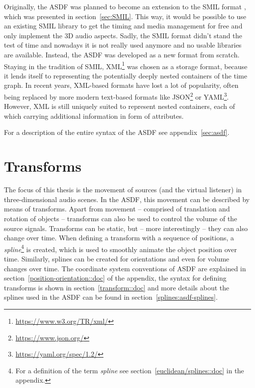 Originally, the ASDF was planned to become
an extension to the SMIL format
\parencite{geier2010future,geier2010object-based},
which was presented in section~\ref{sec:SMIL}.
This way, it would be possible to use an existing SMIL library
to get the timing and media management for free
and only implement the 3D audio aspects.
Sadly, the SMIL format didn't stand the test of time and
nowadays it is not really used anymore and no usable libraries are available.
Instead, the ASDF was developed as a new format from scratch.
Staying in the tradition of SMIL,
XML\footnote{\url{https://www.w3.org/TR/xml/}} was chosen as a storage format,
because it lends itself to representing the potentially deeply nested containers
of the time graph.
In recent years, XML-based formats have lost a lot of popularity,
often being replaced by more modern text-based formats like
JSON\footnote{\url{https://www.json.org/}} or
YAML\footnote{\url{https://yaml.org/spec/1.2/}}.
However, XML is still uniquely suited to represent nested containers,
each of which carrying additional information in form of attributes.

For a description of the entire syntax of the ASDF see appendix~\ref{sec:asdf}.


\section{Transforms}
\label{sec:development-transforms}

The focus of this thesis is the movement of sources (and the virtual listener)
in three-dimensional audio scenes.
In the ASDF, this movement can be described by means of transforms.
Apart from movement -- comprised of translation and rotation of objects --
transforms can also be used to control the volume of the source signals.
Transforms can be static, but -- more interestingly --
they can also change over time.
When defining a transform with a sequence of positions,
a \emph{spline}\footnote{%
For a definition of the term \emph{spline}
see section~\ref{euclidean/splines::doc} in the appendix.}
is created, which is used to smoothly animate the object position over time.
Similarly, splines can be created for orientations
and even for volume changes over time.
The coordinate system conventions of ASDF are explained
in section~\ref{position-orientation::doc}
of the appendix,
the syntax for defining transforms is shown in section~\ref{transform::doc}
and more details about the splines used in the ASDF
can be found in section~\ref{splines:asdf-splines}.

